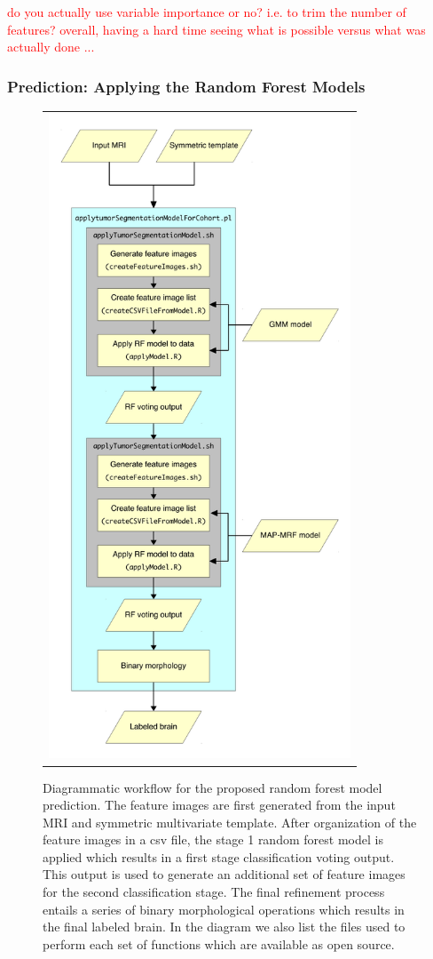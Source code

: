 \documentclass[final,5p,times,twocolumn]{elsarticle}
\begin{document}
\textcolor{red}{do you actually use variable importance or no?
  i.e. to trim the number of features?  overall, having a hard time
  seeing what is possible versus what was actually done ... }

\subsubsection{Prediction:  Applying the Random Forest Models}

\begin{figure}
  \centering
  \begin{tabular}{c}
    \includegraphics[width=90mm]{Figures/pipeline.pdf}
  \end{tabular}
  \caption{Diagrammatic workflow for the proposed random forest model prediction.  The feature
  images are first generated from the input MRI and symmetric multivariate template. 
  After organization of the feature images in a csv file, the stage 1 random forest model is 
  applied which results in a first stage classification voting output.  This output
  is used to generate an additional set of feature images for the second classification
  stage.  The final refinement process entails a series of binary morphological 
  operations which results in the final labeled brain.  In the diagram we also list
  the files used to perform each set of functions which are available as open source.
  }
  \label{fig:pipeline}
\end{figure}
\end{document}
